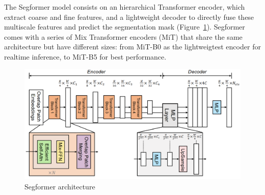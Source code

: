 \begin{table}[ht]
    \centering
    \caption{Comparison of different models. Results are obtained from \cite{DDRNet} \cite{PIDNet} \cite{segformer}.  }
    \label{tab:segformer_model_comparison}
\end{table}


The Segformer model consists on an hierarchical Transformer  encoder, which extract coarse and fine features, and a lightweight  decoder to directly fuse these multiscale features and predict the segmentation mask (Figure~\ref{fig:segformer_architecture}). Segformer comes with a series of Mix Transformer encoders (MiT) that share the same architecture but have different sizes: from MiT-B0 as the lightweigtest encoder for realtime inference, to MiT-B5 for best performance.

\begin{figure}[!ht]
    \centering
    \includegraphics[width=\linewidth]{images/methodology/segformer_architecture.png}
    \caption{Segformer architecture}
    \label{fig:segformer_architecture}
\end{figure}

